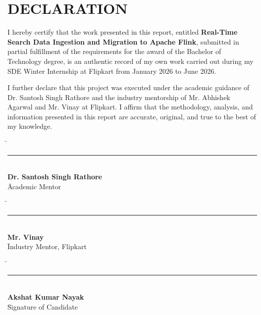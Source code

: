 \newpage
\section*{DECLARATION}

\begin{justify}
I hereby certify that the work presented in this report, entitled \textbf{Real-Time Search Data Ingestion and Migration to Apache Flink}, submitted in partial fulfillment of the requirements for the award of the Bachelor of Technology degree, is an authentic record of my own work carried out during my SDE Winter Internship at Flipkart from January 2026 to June 2026. 

I further declare that this project was executed under the academic guidance of Dr. Santosh Singh Rathore and the industry mentorship of Mr. Abhishek Agarwal and Mr. Vinay at Flipkart. I affirm that the methodology, analysis, and information presented in this report are accurate, original, and true to the best of my knowledge.
\end{justify}

\vspace{3cm}

\noindent
\begin{minipage}[t]{0.3\textwidth}
\begin{tabbing}
 \= \rule{4cm}{0.4pt} \\
 \= \textbf{Dr. Santosh Singh Rathore} \\
 \= Academic Mentor \\
\end{tabbing}
\end{minipage}%
\hfill
\begin{minipage}[t]{0.3\textwidth}
\begin{tabbing}
 \= \rule{4cm}{0.4pt} \\
 \= \textbf{Mr. Vinay} \\
 \= Industry Mentor, Flipkart \\
\end{tabbing}
\end{minipage}%
\hfill
\begin{minipage}[t]{0.3\textwidth}
\begin{tabbing}
 \= \rule{4cm}{0.4pt} \\
 \= \textbf{Akshat Kumar Nayak} \\
 \= Signature of Candidate \\
\end{tabbing}
\end{minipage}